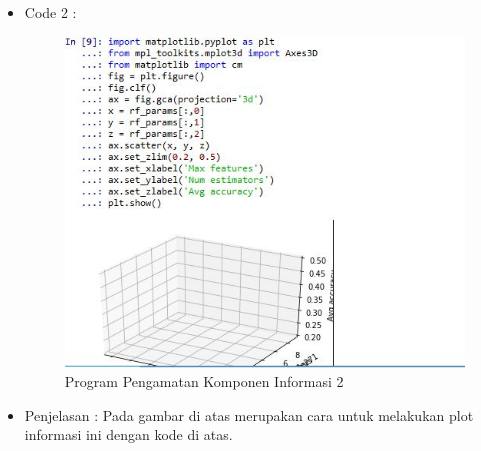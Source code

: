 \begin{enumerate}
\begin{itemize}
\item Code 2 :
\par
\begin{figure}[ht]
\centering
\includegraphics[scale=0.7]{figures/pd30.jpg}
\caption{Program Pengamatan Komponen Informasi 2}
\label{contoh}
\end{figure}
\end{itemize}
\par
\begin{itemize}
\item Penjelasan : Pada gambar di atas merupakan cara untuk  melakukan plot informasi ini dengan kode di atas.
\par 
\par
\end{itemize}



\end{enumerate}
